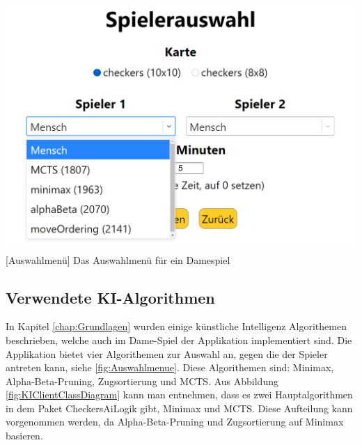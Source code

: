 \documentclass[12pt,a4paper,bibliography=totocnumbered,listof=totocnumbered]{article}
\begin{document}
\vspace{1em}
\begin{minipage}{\linewidth}
	\centering
	\includegraphics[width=0.7\linewidth]{pics/AlgorithmeninderApplikation.png}
	[Auswahlmenü]{ Das Auswahlmenü für ein Damespiel }
	\label{fig:Auswahlmenue}
\end{minipage}

\subsection{Verwendete KI-Algorithmen}
In Kapitel \ref{chap:Grundlagen} wurden einige künstliche Intelligenz Algorithemen beschrieben, welche auch im Dame-Spiel der Applikation implementiert sind.
Die Applikation bietet vier Algorithemen zur Auswahl an, gegen die der Spieler antreten kann, siehe \ref{fig:Auswahlmenue}. 
Diese Algorithemen sind: Minimax, Alpha-Beta-Pruning, Zugsortierung und MCTS.
Aus Abbildung \ref{fig:KIClientClassDiagram}
kann man entnehmen, dass es zwei Hauptalgorithmen in dem Paket CheckersAiLogik gibt, Minimax und MCTS. Diese Aufteilung kann vorgenommen werden,
da Alpha-Beta-Pruning und Zugsortierung auf Minimax basieren.
\end{document}
